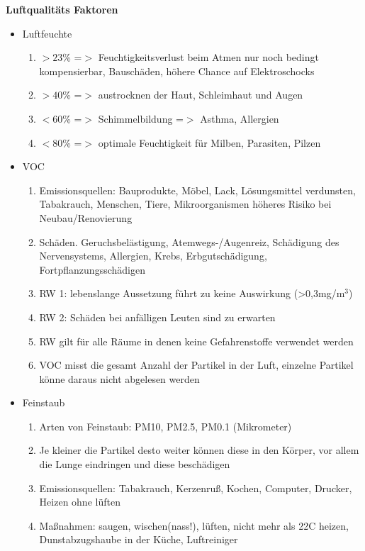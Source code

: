 \documentclass[]{article}
\begin{document}
\textbf{Luftqualitäts Faktoren}~\cite{faktoren_luftquali}
\begin{itemize}
	\item Luftfeuchte
	\begin{enumerate}
		\item $>23$\% =$>$ Feuchtigkeitsverlust beim Atmen nur noch bedingt kompensierbar, Bauschäden, höhere Chance auf Elektroschocks
		\item $>40$\% =$>$ austrocknen der Haut, Schleimhaut und Augen
		\item $<60$\% =$>$ Schimmelbildung =$>$ Asthma, Allergien
		\item $<80$\% =$>$ optimale Feuchtigkeit für Milben, Parasiten, Pilzen
	\end{enumerate}
	\item VOC
	\begin{enumerate}
		\item Emissionsquellen: Bauprodukte, Möbel, Lack, Lösungsmittel verdunsten, Tabakrauch, Menschen, Tiere, Mikroorganismen höheres Risiko bei Neubau/Renovierung
		\item Schäden. Geruchsbelästigung, Atemwegs-/Augenreiz, Schädigung des Nervensystems, Allergien, Krebs, Erbgutschädigung, Fortpflanzungsschädigen
		\item RW 1: lebenslange Aussetzung führt zu keine Auswirkung (>0,3mg/m$^3$)
		\item RW 2: Schäden bei anfälligen Leuten sind zu erwarten
		\item RW gilt für alle Räume in denen keine Gefahrenstoffe verwendet werden
		\item VOC misst die gesamt Anzahl der Partikel in der Luft, einzelne Partikel könne daraus nicht abgelesen werden
	\end{enumerate}
	\item Feinstaub
	\begin{enumerate}
		\item Arten von Feinstaub: PM10, PM2.5, PM0.1 (Mikrometer)
		\item Je kleiner die Partikel desto weiter können diese in den Körper, vor allem die Lunge eindringen und diese beschädigen
		\item Emissionsquellen: Tabakrauch, Kerzenruß, Kochen, Computer, Drucker, Heizen ohne lüften
		\item Maßnahmen: saugen, wischen(nass!), lüften, nicht mehr als 22C heizen, Dunstabzugshaube in der Küche, Luftreiniger
	\end{enumerate}
\end{itemize}
\end{document}
